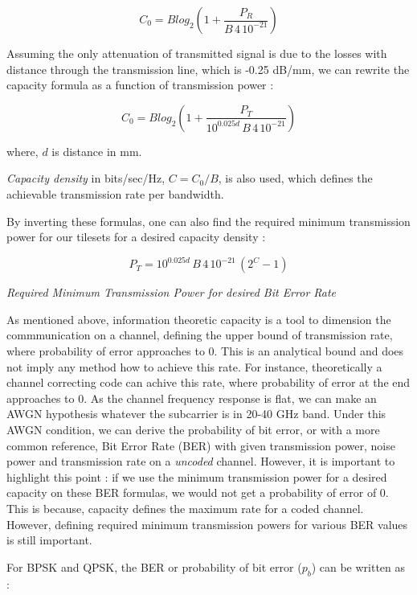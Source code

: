 \begin{equation}
C_{0} = Blog_{2}(1+\frac{P_{R}}{B\,4\,10^{-21}}) 
\end{equation}

Assuming the only attenuation of transmitted signal is due to the losses with distance through the transmission line, which is -0.25 dB/mm, we can rewrite the capacity formula as a function of transmission power :


\begin{equation}
C_{0} = Blog_{2}(1+\frac{P_{T}}{10^{0.025d}\,B\,4\,10^{-21}}) 
\end{equation}

where, $d$ is distance in mm.

\textit{Capacity density} in bits/sec/Hz, $C = C_{0}/B$, is also used, which defines the achievable transmission rate per bandwidth. 

By inverting these formulas, one can also find the required minimum transmission power for our tilesets for a desired capacity density : 

\begin{equation}
P_{T} = 10^{0.025d}\,B\,4\,10^{-21}\,(2^{C}-1) 
\end{equation}

\textit{Required Minimum Transmission Power for desired Bit Error Rate}


As mentioned above, information theoretic capacity is a tool to dimension the commmunication on a channel, defining the upper bound of transmission rate, where probability of error approaches to 0. This is an analytical bound and does not imply any method how to achieve this rate. For instance, theoretically a channel correcting code can achive this rate, where probability of error at the end approaches to 0. As the channel frequency response is flat, we can make an AWGN hypothesis whatever the subcarrier is in 20-40 GHz band. Under this AWGN condition, we can derive the probability of bit error, or with a more common reference, Bit Error Rate (BER) with given transmission power, noise power and transmission rate on a \textit{uncoded} channel. However, it is important to highlight this point : if we use the minimum transmission power for a desired capacity on these BER formulas, we would not get a probability of error of 0. This is because, capacity defines the maximum rate for a coded channel. However, defining required minimum transmission powers for various BER values is still important. 

For BPSK and QPSK, the BER or probability of bit error ($p_{b}$) can be written as \cite{goldsmith2005wireless}: 

